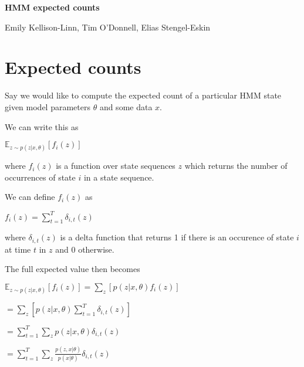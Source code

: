 \documentclass[11pt]{article}
\newcommand{\myindent}{\hspace{2cm}}
\begin{document}
\begin{center}
	
	{\Large \textbf{HMM expected counts}}

	{\normalsize Emily Kellison-Linn, Tim O'Donnell, Elias Stengel-Eskin}
			
\end{center}

\section{Expected counts}

Say we would like to compute the expected count of a particular HMM state given model parameters $\theta$ and some data $x$. 

We can write this as 

\myindent $\mathbb{E}_{z\sim p(z|x,\theta)}[f_i(z)]$

where $f_i(z)$ is a function over state sequences $z$ which returns the number of occurrences of state $i$ in a state sequence.

We can define $f_i(z)$ as

\myindent $f_i(z) = \sum_{t=1}^{T}\delta_{i,t}(z)$

where $\delta_{i,t}(z)$ is a delta function that returns 1 if there is an occurence of state $i$ at time $t$ in $z$ and 0 otherwise.

The full expected value then becomes 

\myindent $\mathbb{E}_{z\sim p(z|x,\theta)}[f_i(z)] = \sum_{z} [p(z|x,\theta)f_i(z)]$

\myindent $=\sum_z [p(z|x,\theta) \sum_{t=1}^{T} \delta_{i,t}(z) ]$

\myindent $= \sum_{t=1}^{T} \sum_z p(z|x,\theta) \delta_{i,t}(z)$

\myindent $= \sum_{t=1}^{T} \sum_z \frac{p(z,x|\theta)}{p(x|\theta)} \delta_{i,t}(z)$
\end{document}
